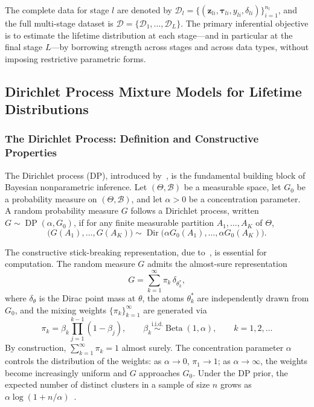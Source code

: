\documentclass[a4paper,fleqn,longmktitle]{cas-sc}
\DeclareMathOperator{\DP}{DP}
\DeclareMathOperator{\Dir}{Dir}
\DeclareMathOperator{\Be}{Beta}
\newcommand{\iid}{\overset{\text{i.i.d.}}{\sim}}
\begin{document}
The complete data for stage $l$ are denoted by $\mathcal{D}_l = \{(\bm{z}_{li}, \bm{\tau}_{li}, y_{li}, \delta_{li})\}_{i=1}^{n_l}$, and the full multi-stage dataset is $\mathcal{D} = \{\mathcal{D}_1, \ldots, \mathcal{D}_L\}$. The primary inferential objective is to estimate the lifetime distribution at each stage---and in particular at the final stage $L$---by borrowing strength across stages and across data types, without imposing restrictive parametric forms.

\subsection{Dirichlet Process Mixture Models for Lifetime Distributions}
\label{sec:dpm}

\subsubsection{The Dirichlet Process: Definition and Constructive Properties}

The Dirichlet process (DP), introduced by~\cite{Ferguson1973}, is the fundamental building block of Bayesian nonparametric inference. Let $(\Theta, \mathcal{B})$ be a measurable space, let $G_0$ be a probability measure on $(\Theta, \mathcal{B})$, and let $\alpha > 0$ be a concentration parameter. A random probability measure $G$ follows a Dirichlet process, written $G \sim \DP(\alpha, G_0)$, if for any finite measurable partition $A_1, \ldots, A_K$ of $\Theta$,
\begin{equation}\label{eq:dp_def}
    \bigl(G(A_1), \ldots, G(A_K)\bigr) \sim \Dir\bigl(\alpha G_0(A_1), \ldots, \alpha G_0(A_K)\bigr).
\end{equation}

The constructive stick-breaking representation, due to~\cite{Sethuraman1994}, is essential for computation. The random measure $G$ admits the almost-sure representation
\begin{equation}\label{eq:stick_rep}
    G = \sum_{k=1}^{\infty} \pi_k \,\delta_{\theta_k^*},
\end{equation}
where $\delta_{\theta}$ is the Dirac point mass at $\theta$, the atoms $\theta_k^*$ are independently drawn from $G_0$, and the mixing weights $\{\pi_k\}_{k=1}^{\infty}$ are generated via
\begin{equation}\label{eq:stick_break}
    \pi_k = \beta_k \prod_{j=1}^{k-1} (1 - \beta_j), \qquad
    \beta_k \iid \Be(1, \alpha), \qquad k = 1, 2, \ldots
\end{equation}
By construction, $\sum_{k=1}^{\infty} \pi_k = 1$ almost surely. The concentration parameter $\alpha$ controls the distribution of the weights: as $\alpha \to 0$, $\pi_1 \to 1$; as $\alpha \to \infty$, the weights become increasingly uniform and $G$ approaches $G_0$. Under the DP prior, the expected number of distinct clusters in a sample of size $n$ grows as $\alpha \log(1 + n/\alpha)$~\cite{Antoniak1974}.
\end{document}
